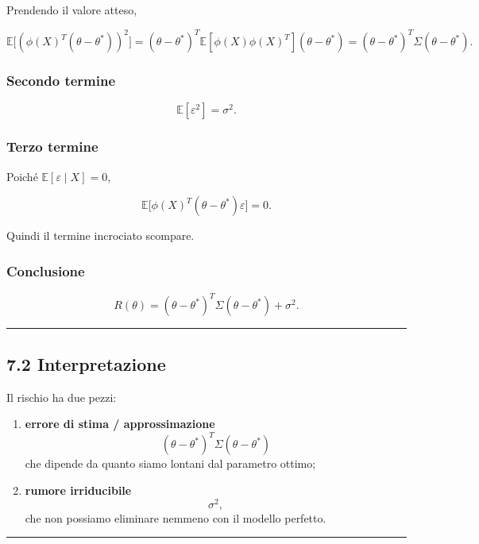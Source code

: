 \documentclass{article}
\begin{document}
Prendendo il valore atteso,

\[
\mathbb{E}\big[(\phi(X)^T(\theta-\theta^*))^2\big]
=
(\theta-\theta^*)^T
\mathbb{E}[\phi(X)\phi(X)^T]
(\theta-\theta^*)
=
(\theta-\theta^*)^T\Sigma(\theta-\theta^*).
\]

\subsubsection{Secondo termine}\label{secondo-termine}

\[
\mathbb{E}[\varepsilon^2]=\sigma^2.
\]

\subsubsection{Terzo termine}\label{terzo-termine}

Poiché \(\mathbb{E}[\varepsilon\mid X]=0\),

\[
\mathbb{E}\big[\phi(X)^T(\theta-\theta^*)\varepsilon\big]=0.
\]

Quindi il termine incrociato scompare.

\subsubsection{Conclusione}\label{conclusione-5}

\[
R(\theta)=
(\theta-\theta^*)^T\Sigma(\theta-\theta^*)+\sigma^2.
\]

\begin{center}\rule{0.5\linewidth}{0.5pt}\end{center}

\subsection{7.2 Interpretazione}\label{interpretazione-5}

Il rischio ha due pezzi:

\begin{enumerate}
\def\labelenumi{\arabic{enumi}.}
\item
  \textbf{errore di stima / approssimazione} \[
  (\theta-\theta^*)^T\Sigma(\theta-\theta^*)
  \] che dipende da quanto siamo lontani dal parametro ottimo;
\item
  \textbf{rumore irriducibile} \[
  \sigma^2,
  \] che non possiamo eliminare nemmeno con il modello perfetto.
\end{enumerate}

\begin{center}\rule{0.5\linewidth}{0.5pt}\end{center}
\end{document}
